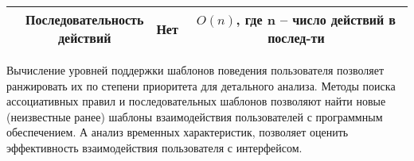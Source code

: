 \begin{table}[H]
\begin{center}
\begin{tabular}{ | c | c | c | c | }
			\specialcell{GOMS} & \specialcell{Последовательность\\действий} & Нет & \specialcell{$O(n)$, где n --\\число действий\\в послед-ти} \\ \hline
		\end{tabular}
	\end{center}
\end{table}

Вычисление уровней поддержки шаблонов поведения пользователя позволяет ранжировать их по степени приоритета для детального анализа.
Методы поиска ассоциативных правил и последовательных шаблонов позволяют найти новые (неизвестные ранее) шаблоны взаимодействия пользователей с программным обеспечением.
А анализ временных характеристик, позволяет оценить эффективность взаимодействия пользователя с интерфейсом.